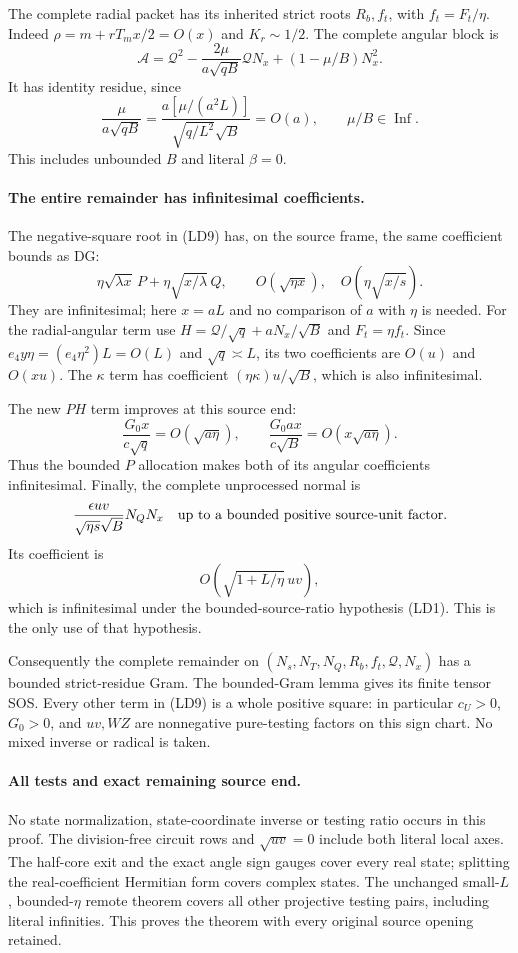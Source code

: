 The complete radial packet has its inherited strict roots $R_b,f_t$,
with $f_t=F_t/\eta$. Indeed $\rho=m+rT_mx/2=O(x)$ and
$K_r\sim1/2$. The complete angular block is
\[
 \mathscr A=\mathcal Q^2-
       \frac{2\mu}{a\sqrt{qB}}\mathcal QN_x
                  +(1-\mu/B)N_x^2.
\]
It has identity residue, since
\[
 \frac{\mu}{a\sqrt{qB}}
       =\frac{a[\mu/(a^2L)]}{\sqrt{q/L^2}\sqrt B}=O(a),
 \qquad\mu/B\in\operatorname{Inf}.                 \tag{LD11}
\]
This includes unbounded $B$ and literal $\beta=0$.

\paragraph{The entire remainder has infinitesimal coefficients.}
The negative-square root in (LD9) has, on the source frame,
the same coefficient bounds as DG:
\[
 \eta\sqrt{\lambda x}\,P+
           \eta\sqrt{x/\lambda}\,Q,
 \qquad O(\sqrt{\eta x}),\quad
           O(\eta\sqrt{x/s}).                       \tag{LD12}
\]
They are infinitesimal; here $x=aL$ and no comparison of $a$ with
$\eta$ is needed. For the radial-angular term use
$H=\mathcal Q/\sqrt q+aN_x/\sqrt B$ and $F_t=\eta f_t$.
Since $e_4y\eta=(e_4\eta^2)L=O(L)$ and $\sqrt q\asymp L$,
its two coefficients are $O(u)$ and $O(xu)$.
The $\kappa$ term has coefficient
$(\eta\kappa)u/\sqrt B$, which is also infinitesimal.

The new $PH$ term improves at this source end:
\[
 \frac{G_0x}{c\sqrt q}=O(\sqrt{a\eta}),\qquad
 \frac{G_0ax}{c\sqrt B}=O(x\sqrt{a\eta}).            \tag{LD13}
\]
Thus the bounded $P$ allocation makes both of its angular coefficients
infinitesimal. Finally, the complete unprocessed normal is
\[
 \frac{\epsilon uv}{\sqrt{\eta s}\sqrt B}N_QN_x
   \quad\hbox{up to a bounded positive source-unit factor}.
\]
Its coefficient is
\[
                  O\!\left(\sqrt{1+L/\eta}\,uv\right),          \tag{LD14}
\]
which is infinitesimal under the bounded-source-ratio
hypothesis (LD1). This is the only use of that hypothesis.

Consequently the complete remainder on
$(N_s,N_T,N_Q,R_b,f_t,\mathcal Q,N_x)$ has a bounded strict-residue
Gram. The bounded-Gram lemma gives its finite tensor SOS. Every other
term in (LD9) is a whole positive square: in particular $c_U>0$,
$G_0>0$, and $uv,WZ$ are nonnegative pure-testing factors on this
sign chart. No mixed inverse or radical is taken.

\paragraph{All tests and exact remaining source end.}
No state normalization, state-coordinate inverse or testing ratio
occurs in this proof. The division-free circuit rows and
$\sqrt{uv}=0$ include both literal local axes. The half-core exit
and the exact angle sign gauges cover every real state; splitting
the real-coefficient Hermitian form covers complex states. The
unchanged small-$L$, bounded-$\eta$ remote theorem covers all other
projective testing pairs, including literal infinities. This proves
the theorem with every original source opening retained.

